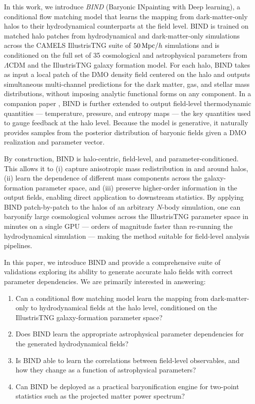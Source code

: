 \documentclass[linenumbers,trackchanges, twocolumn]{aastex701}
\begin{document}
In this work, we introduce \emph{BIND} (Baryonic INpainting with Deep learning), a conditional flow matching model that learns the mapping from dark-matter-only halos to their hydrodynamical counterparts at the field level. BIND is trained on matched halo patches from hydrodynamical and dark-matter-only simulations across the CAMELS IllustrisTNG suite of $50\,{\rm Mpc}/h$ simulations and is conditioned on the full set of 35 cosmological and astrophysical parameters from $\Lambda$CDM and the IllustrisTNG galaxy formation model. For each halo, BIND takes as input a local patch of the DMO density field centered on the halo and outputs simultaneous multi-channel predictions for the dark matter, gas, and stellar mass distributions, without imposing analytic functional forms on any component. In a companion paper \citep{Lee-2026c}, \textsc{BIND} is further extended to output field-level thermodynamic quantities --- temperature, pressure, and entropy maps --- the key quantities used to gauge feedback at the halo level. Because the model is generative, it naturally provides samples from the posterior distribution of baryonic fields given a DMO realization and parameter vector. 

By construction, BIND is halo-centric, field-level, and parameter-conditioned. This allows it to (i) capture anisotropic mass redistribution in and around halos, (ii) learn the dependence of different mass components across the galaxy-formation parameter space, and (iii) preserve higher-order information in the output fields, enabling direct application to downstream statistics. By applying BIND patch-by-patch to the halos of an arbitrary $N$-body simulation, one can baryonify large cosmological volumes across the IllustrisTNG parameter space in minutes on a single GPU --- orders of magnitude faster than re-running the hydrodynamical simulation --- making the method suitable for field-level analysis pipelines.

In this paper, we introduce BIND and provide a comprehensive suite of validations exploring its ability to generate accurate halo fields with correct parameter dependencies. We are primarily interested in answering:
\begin{enumerate}
    \item Can a conditional flow matching model learn the mapping from dark-matter-only to hydrodynamical fields at the halo level, conditioned on the IllustrisTNG galaxy-formation parameter space?
    \item Does BIND learn the appropriate astrophysical parameter dependencies for the generated hydrodynamical fields?
    \item Is BIND able to learn the correlations between field-level observables, and how they change as a function of astrophysical parameters?
    \item Can BIND be deployed as a practical baryonification engine for two-point statistics such as the projected matter power spectrum?
\end{enumerate}
\end{document}

